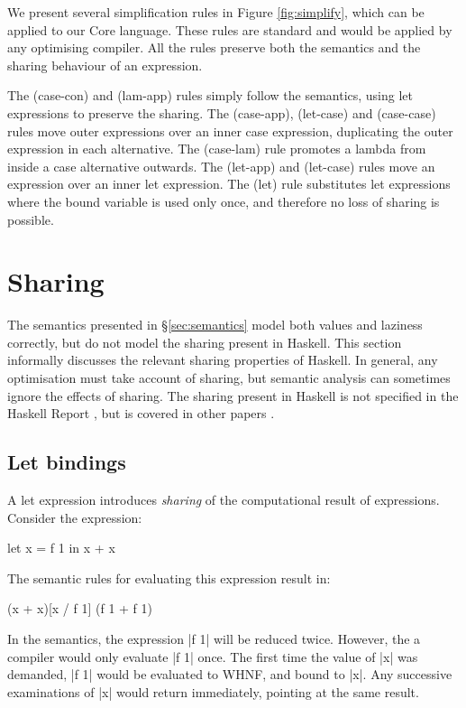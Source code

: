 We present several simplification rules in Figure \ref{fig:simplify}, which can be applied to our Core language. These rules are standard and would be applied by any optimising compiler. All the rules preserve both the semantics and the sharing behaviour of an expression.

The (case-con) and (lam-app) rules simply follow the semantics, using let expressions to preserve the sharing. The (case-app), (let-case) and (case-case) rules move outer expressions over an inner case expression, duplicating the outer expression in each alternative. The (case-lam) rule promotes a lambda from inside a case alternative outwards. The (let-app) and (let-case) rules move an expression over an inner let expression. The (let) rule substitutes let expressions where the bound variable is used only once, and therefore no loss of sharing is possible.


\section{Sharing}
\label{sec:sharing}

The semantics presented in \S\ref{sec:semantics} model both values and laziness correctly, but do not model the sharing present in Haskell. This section informally discusses the relevant sharing properties of Haskell. In general, any optimisation must take account of sharing, but semantic analysis can sometimes ignore the effects of sharing. The sharing present in Haskell is not specified in the Haskell Report \cite{haskell}, but is covered in other papers .

\subsection{Let bindings}

A let expression introduces \textit{sharing} of the computational result of expressions. Consider the expression:

\begin{example}
\begin{code}
let x = f 1
in x + x
\end{code}

The semantic rules for evaluating this expression result in:

\begin{code}
(x + x)[x / f 1]
(f 1 + f 1)
\end{code}

In the semantics, the expression |f 1| will be reduced twice. However, the a compiler would only evaluate |f 1| once. The first time the value of |x| was demanded, |f 1| would be evaluated to WHNF, and bound to |x|. Any successive examinations of |x| would return immediately, pointing at the same result.
\end{example}

